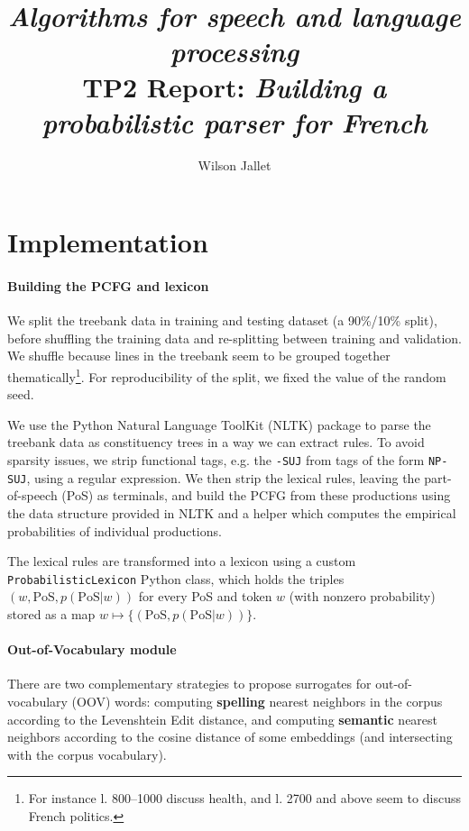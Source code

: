 \documentclass[11pt]{article}
\title{\textit{Algorithms for speech and language processing}\\
{\sffamily TP2 Report: \textit{Building a probabilistic parser for French}}}
\author{Wilson Jallet}
\begin{document}
\maketitle

\section{Implementation}

\paragraph{Building the PCFG and lexicon}

We split the treebank data in training and testing dataset (a 90\%/10\% split), before shuffling the training data and re-splitting between training and validation. We shuffle because lines in the treebank seem to be grouped together thematically\footnote{For instance l. 800--1000 discuss health, and l. 2700 and above seem to discuss French politics.}. For reproducibility of the split, we fixed the value of the random seed.

We use the Python Natural Language ToolKit (NLTK) \cite{nltkCitation} package to parse the treebank data as constituency trees in a way we can extract rules. To avoid sparsity issues, we strip functional tags, e.g. the \lstinline|-SUJ| from tags of the form \lstinline|NP-SUJ|, using a regular expression.
We then strip the lexical rules, leaving the part-of-speech (PoS) as terminals, and build the PCFG from these productions using the data structure provided in NLTK and a helper which computes the empirical probabilities of individual productions.

The lexical rules are transformed into a lexicon using a custom \lstinline|ProbabilisticLexicon| Python class, which holds the triples $(w,\mathrm{PoS}, p(\mathrm{PoS}|w))$ for every PoS and token $w$ (with nonzero probability) stored as a map $w \mapsto \{(\mathrm{PoS},p(\mathrm{PoS}|w))\}$.



\paragraph{Out-of-Vocabulary module}

There are two complementary strategies to propose surrogates for out-of-vocabulary (OOV) words: computing \textbf{spelling} nearest neighbors in the corpus according to the Levenshtein Edit distance, and computing \textbf{semantic} nearest neighbors according to the cosine distance of some embeddings (and intersecting with the corpus vocabulary).
\end{document}

